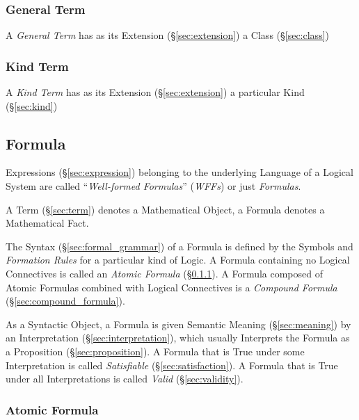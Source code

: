 \subsubsection{General Term}\label{sec:general_term}
\cite{chalmers02}

A \emph{General Term} has as its Extension (\S\ref{sec:extension}) a
Class (\S\ref{sec:class})



\subsubsection{Kind Term}\label{sec:kind_term}
\cite{chalmers02}

A \emph{Kind Term} has as its Extension (\S\ref{sec:extension}) a
particular Kind (\S\ref{sec:kind})




\subsection{Formula}\label{sec:formula}

Expressions (\S\ref{sec:expression}) belonging to the underlying
Language of a Logical System are called ``\emph{Well-formed
  Formulas}'' (\emph{WFFs}) or just \emph{Formulas}.

A Term (\S\ref{sec:term}) denotes a Mathematical Object, a Formula
denotes a Mathematical Fact.

The Syntax (\S\ref{sec:formal_grammar}) of a Formula is defined by the
Symbols and \emph{Formation Rules} for a particular kind of Logic. A
Formula containing no Logical Connectives is called an \emph{Atomic
  Formula} (\S\ref{sec:atomic_formula}). A Formula composed of Atomic
Formulas combined with Logical Connectives is a \emph{Compound
  Formula} (\S\ref{sec:compound_formula}).

As a Syntactic Object, a Formula is given Semantic Meaning
(\S\ref{sec:meaning}) by an Interpretation
(\S\ref{sec:interpretation}), which usually Interprets the Formula as
a Proposition (\S\ref{sec:proposition}). A Formula that is True under
some Interpretation is called \emph{Satisfiable}
(\S\ref{sec:satisfaction}). A Formula that is True under all
Interpretations is called \emph{Valid} (\S\ref{sec:validity}).



\subsubsection{Atomic Formula}\label{sec:atomic_formula}

